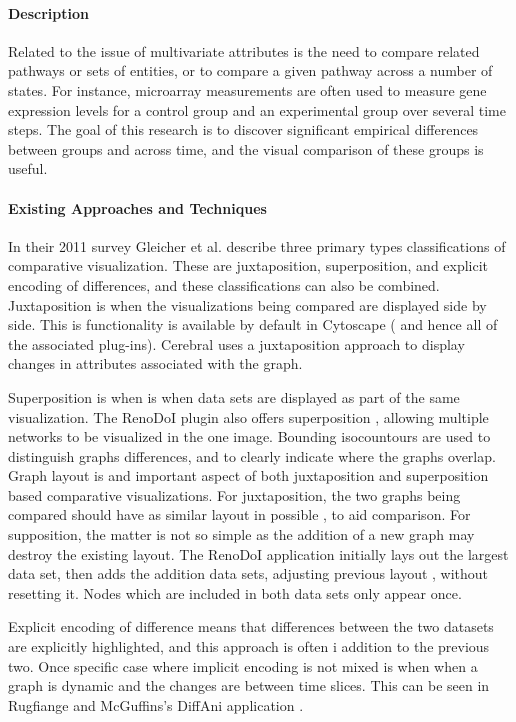 \paragraph{Description}

Related to the issue of multivariate attributes is the need to compare related pathways or sets of entities, or to compare a given pathway across a number of states.
For instance, microarray measurements are often used to measure gene expression levels for a control group and an experimental group over several time steps.
The goal of this research is to discover significant empirical differences between groups and across time, and the visual comparison of these groups is useful.

\paragraph{Existing Approaches and Techniques}

In their 2011 survey Gleicher et al. \cite{Gleicher2011} describe three primary types  classifications of comparative visualization.
These are  juxtaposition, superposition,  and explicit encoding of differences, and these classifications can also be combined.
Juxtaposition is when the visualizations being compared are displayed side by side.
This is functionality is available by default in Cytoscape ( and hence all of the associated plug-ins).
Cerebral uses a juxtaposition approach to display changes in attributes associated with the graph.

Superposition is when is when data sets are displayed as part of the same visualization.
The RenoDoI plugin also offers superposition , allowing multiple networks to be  visualized in the  one image. Bounding isocountours are used to distinguish graphs differences, and to clearly indicate where the graphs overlap.
Graph layout is and important aspect of both juxtaposition and superposition based comparative visualizations.
For juxtaposition, the two graphs being compared should have as similar layout in possible , to aid comparison.
For supposition, the matter is not so simple as the addition of a new graph may destroy the existing layout.
The RenoDoI application\cite{Vehlow2015} initially lays out the largest data set, then adds the addition data sets, adjusting previous layout , without resetting it.
Nodes which are  included in both data sets only appear once.

Explicit encoding of difference  means that differences between the two datasets are explicitly highlighted, and this approach is often i addition to the previous two.
Once specific case where implicit encoding is not mixed is when when a graph is dynamic and the changes are between time slices.
This can be seen in Rugfiange and McGuffins's DiffAni application \cite{Rufiange2013}.


